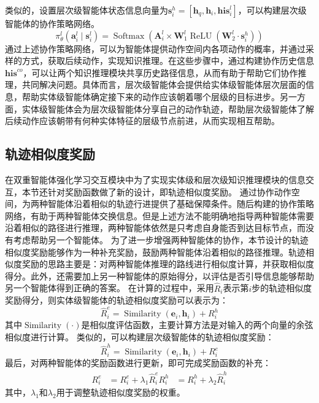 \documentclass[algorithmlist, AutoFakeBold, AutoFakeSlant, figurelist, tablelist, nomlist, masters]{seuthesix}
\begin{document}
类似的，设置层次级智能体状态信息向量为$\bm{s}_i^{h} = \left[\bm{h}_q, \bm{h}_i, \bm{his}_i^l\right]$，可以构建层次级智能体的协作策略网络。
\begin{equation}
  \pi_\theta^l\left(\bm{a}_i^l \mid \bm{s}_i^l\right) =\operatorname{Softmax}\left(\bm{A}_i^l \times \mathbf{W}_1^l \operatorname{ReLU}\left(\mathbf{W}_2^l \cdot \bm{s}_i^{h}\right)\right)
\end{equation}
通过上述协作策略网络，可以为智能体提供动作空间内各项动作的概率，并通过采样的方式，获取后续动作，实现知识推理。在这些步骤中，通过构建协作历史信息$\bm{his}^{co}$，可以让两个知识推理模块共享历史路径信息，从而有助于帮助它们协作推理，共同解决问题。具体而言，层次级智能体会提供给实体级智能体层次层面的信息，帮助实体级智能体确定接下来的动作应该朝着哪个层级的目标进步。另一方面，实体级智能体会为层次级智能体分享自己的动作轨迹，帮助层次级智能体了解后续动作应该朝带有何种实体特征的层级节点前进，从而实现相互帮助。

\subsection{轨迹相似度奖励}
在双重智能体强化学习交互模块中为了实现实体级和层次级知识推理模块的信息交互，本节还针对奖励函数做了新的设计，即轨迹相似度奖励。
通过协作动作空间，为两种智能体沿着相似的轨迹行进提供了基础保障条件。随后构建的协作策略网络，有助于两种智能体交换信息。但是上述方法不能明确地指导两种智能体需要沿着相似的路径进行推理，两种智能体依然是只考虑自身能否到达目标节点，而没有考虑帮助另一个智能体。
为了进一步增强两种智能体的协作，本节设计的轨迹相似度奖励能够作为一种补充奖励，鼓励两种智能体沿着相似的路径推理。轨迹相似度奖励的思路主要是：对两种智能体推理的路线进行相似度计算，并获取相似度得分。此外，还需要加上另一种智能体的原始得分，以评估是否引导信息能够帮助另一个智能体得到正确的答案。
在计算的过程中，采用$\hat{R}_i$表示第$i$步的轨迹相似度奖励得分，则实体级智能体的轨迹相似度奖励可以表示为：
\begin{equation}
  \hat{R}_i^e = \operatorname{Similarity}(\bm{e}_i, \bm{h}_i) + R_i^h
\end{equation}
其中$\operatorname{Similarity}(\cdot)$是相似度评估函数，主要计算方法是对输入的两个向量的余弦相似度进行计算。
类似的，可以构建层次级智能体的轨迹相似度奖励：
\begin{equation}
  \hat{R}_i^h = \operatorname{Similarity}(\bm{e}_i, \bm{h}_i) + R_i^e
\end{equation}
最后，对两种智能体的奖励函数进行更新，即可完成奖励函数的补充：
\begin{equation}
  \begin{aligned}
    R_i^e &= R_i^e + \lambda_1 \hat{R}_i^e
    R_i^h &= R_i^h + \lambda_2 \hat{R}_i^h
  \end{aligned}
\end{equation}
其中，$\lambda_1$和$\lambda_2$用于调整轨迹相似度奖励的权重。
\end{document}
